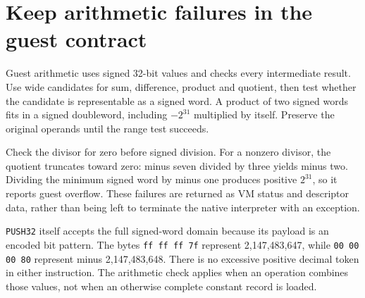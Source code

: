 \section{Keep arithmetic failures in the guest contract}\label{vm-arithmetic}
Guest arithmetic uses signed 32-bit values and checks every intermediate result.
Use wide candidates for sum, difference, product and quotient, then test whether the
candidate is representable as a signed word. A product of two signed words fits in
a signed doubleword, including $-2^{31}$ multiplied by itself. Preserve the original
operands until the range test succeeds.

Check the divisor for zero before signed division. For a nonzero divisor, the quotient
truncates toward zero: minus seven divided by three yields minus two. Dividing the
minimum signed word by minus one produces positive $2^{31}$, so it reports guest
overflow. These failures are returned as VM status and descriptor data, rather than
being left to terminate the native interpreter with an exception.

\texttt{PUSH32} itself accepts the full signed-word domain because its payload is an
encoded bit pattern. The bytes \texttt{ff ff ff 7f} represent 2,147,483,647, while
\texttt{00 00 00 80} represent minus 2,147,483,648. There is no excessive positive
decimal token in either instruction. The arithmetic check applies when an operation
combines those values, not when an otherwise complete constant record is loaded.
